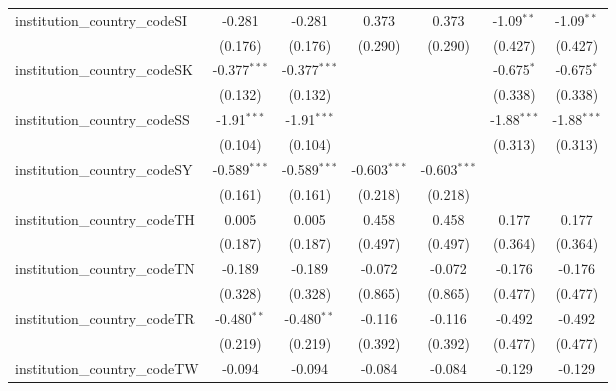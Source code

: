 \begin{tabular}{lcccccc}
   institution\_country\_codeSI          & -0.281         & -0.281         & 0.373          & 0.373          & -1.09$^{**}$   & -1.09$^{**}$\\   
                                         & (0.176)        & (0.176)        & (0.290)        & (0.290)        & (0.427)        & (0.427)\\   
   institution\_country\_codeSK          & -0.377$^{***}$ & -0.377$^{***}$ &                &                & -0.675$^{*}$   & -0.675$^{*}$\\   
                                         & (0.132)        & (0.132)        &                &                & (0.338)        & (0.338)\\   
   institution\_country\_codeSS          & -1.91$^{***}$  & -1.91$^{***}$  &                &                & -1.88$^{***}$  & -1.88$^{***}$\\   
                                         & (0.104)        & (0.104)        &                &                & (0.313)        & (0.313)\\   
   institution\_country\_codeSY          & -0.589$^{***}$ & -0.589$^{***}$ & -0.603$^{***}$ & -0.603$^{***}$ &                &   \\   
                                         & (0.161)        & (0.161)        & (0.218)        & (0.218)        &                &   \\   
   institution\_country\_codeTH          & 0.005          & 0.005          & 0.458          & 0.458          & 0.177          & 0.177\\   
                                         & (0.187)        & (0.187)        & (0.497)        & (0.497)        & (0.364)        & (0.364)\\   
   institution\_country\_codeTN          & -0.189         & -0.189         & -0.072         & -0.072         & -0.176         & -0.176\\   
                                         & (0.328)        & (0.328)        & (0.865)        & (0.865)        & (0.477)        & (0.477)\\   
   institution\_country\_codeTR          & -0.480$^{**}$  & -0.480$^{**}$  & -0.116         & -0.116         & -0.492         & -0.492\\   
                                         & (0.219)        & (0.219)        & (0.392)        & (0.392)        & (0.477)        & (0.477)\\   
   institution\_country\_codeTW          & -0.094         & -0.094         & -0.084         & -0.084         & -0.129         & -0.129\\   

\end{tabular}
